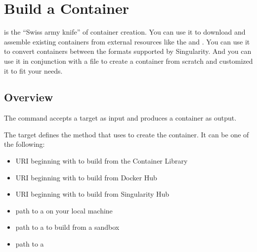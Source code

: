 \documentclass[letterpaper,10pt,english]{sphinxmanual}
\begin{document}
\chapter{Build a Container}
\label{\detokenize{build_a_container:build-a-container}}\label{\detokenize{build_a_container:id1}}\label{\detokenize{build_a_container::doc}}\label{\detokenize{build_a_container:sec-build-a-container}}
 is the “Swiss army knife” of container creation. You can use it to
download and assemble existing containers from external resources like the
 and
. You can use it to convert containers
between the formats supported by Singularity. And you can use it in conjunction
with a  file to create a
container from scratch and customized it to fit your needs.


\section{Overview}
\label{\detokenize{build_a_container:overview}}
The  command accepts a target as input and produces a container as
output.

The target defines the method that  uses to create the container. It
can be one of the following:
\begin{itemize}
\item {} 
URI beginning with  to build from the Container Library

\item {} 
URI beginning with  to build from Docker Hub

\item {} 
URI beginning with  to build from Singularity Hub

\item {} 
path to a  on your local machine

\item {} 
path to a  to build from a sandbox

\item {} 
path to a 

\end{itemize}
\end{document}
